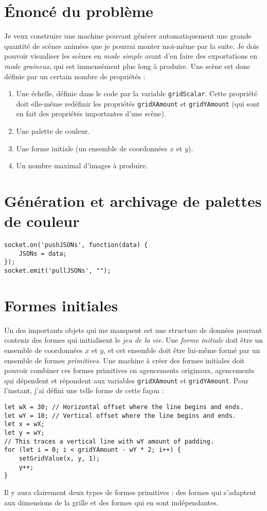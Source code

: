 
\section{Énoncé du problème}
\noindent Je veux construire une machine pouvant générer automatiquement une grande quantité de scènes animées que je pourrai monter moi-même par la suite. Je dois pouvoir visualiser les scènes en \textit{mode simple} avant d'en faire des exportations en \textit{mode graineux}, qui est immensément plus long à produire. Une scène est donc définie par un certain nombre de propriétés : 

\begin{enumerate}
\item Une échelle, définie dans le code par la variable \lstinline|gridScalar|. Cette propriété doit elle-même redéfinir les propriétés \lstinline|gridXAmount| et \lstinline|gridYAmount| (qui sont en fait des propriétés importantes d'une scène).
\item Une palette de couleur.
\item Une forme initiale (un ensemble de coordonnées $x$ et $y$).
\item Un nombre maximal d'images à produire.

\end{enumerate}

\newpage
\section{Génération et archivage de palettes de couleur}
\begin{lstlisting}
socket.on('pushJSONs', function(data) {
    JSONs = data;
});
socket.emit('pullJSONs', "");
\end{lstlisting}

\section{Formes initiales}
\noindent Un des importants objets qui me manquent est une structure de données pouvant contenir des formes qui initialisent le \textit{jeu de la vie}. Une \textit{forme initiale} doit être un ensemble de coordonnées $x$ et $y$, et cet ensemble doit être lui-même formé par un ensemble de formes \textit{primitives}. Une machine à créer des formes initiales doit pouvoir combiner ces formes primitives en agencements originaux, agencements qui dépendent et répondent aux variables \lstinline|gridXAmount| et \lstinline|gridYAmount|. Pour l'instant, j'ai défini une telle forme de cette façon :
\begin{lstlisting}
let wX = 30; // Horizontal offset where the line begins and ends.
let wY = 10; // Vertical offset where the line begins and ends.
let x = wX;
let y = wY;
// This traces a vertical line with wY amount of padding.
for (let i = 0; i < gridYAmount - wY * 2; i++) {
    setGridValue(x, y, 1);
    y++;
}
\end{lstlisting}
\noindent Il y aura clairement deux types de formes primitives : des formes qui s'adaptent aux dimensions de la grille et des formes qui en sont indépendantes.
